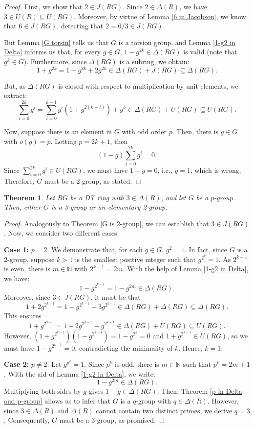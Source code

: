 \documentclass[12pt]{amsart}
\newtheorem{theorem}{Theorem}[section]
\theoremstyle{definition}
\begin{document}
\begin{proof}
First, we show that $2 \in J(RG)$. Since $2 \in \Delta(R)$, we have $3 \in U(R) \subseteq U(RG)$. Moreover, by virtue of Lemma \ref{6 in Jacobson}, we know that $6 \in J(RG)$, detecting that $2 = 6/3 \in J(RG)$.

But Lemma \ref{G torsin} tells us that $G$ is a torsion group, and Lemma \ref{1-g2 in Delta} informs us that, for every $g \in G$, $1 - g^{2k} \in \Delta(RG)$ is valid (note that $g^k \in G$). Furthermore, since $\Delta(RG)$ is a subring, we obtain:
\[
1 + g^{2k} = 1 - g^{2k} + 2g^{2k} \in \Delta(RG) + J(RG) \subseteq \Delta(RG).
\]

But, as $\Delta(RG)$ is closed with respect to multiplication by unit elements, we extract:
\[
\sum_{i=0}^{2k} g^i = \sum_{i=0}^{k-1} g^i(1 + g^{2(k-i)}) + g^k \in \Delta(RG) + U(RG) \subseteq U(RG).
\]

Now, suppose there is an element in $G$ with odd order $p$. Then, there is $g \in G$ with $o(g) = p$. Letting $p = 2k + 1$, then
\[
(1 - g)\sum_{i=0}^{2k} g^i = 0.
\]
Since $\sum_{i=0}^{2k} g^i \in U(RG)$, we must have $1 - g = 0$, i.e., $g=1$, which is wrong. Therefore, $G$ must be a 2-group, as stated.
\end{proof}

\begin{theorem}\label{G is 3-group or elementary 2-group}
Let $RG$ be a DT ring with $3 \in \Delta(R)$, and let $G$ be a $p$-group. Then, either $G$ is a 3-group or an elementary 2-group.
\end{theorem}

\begin{proof}
Analogously to Theorem \ref{G is 2-group}, we can establish that $3 \in J(RG)$. Now, we consider two different cases:

\medskip

\textbf{Case 1:} $p=2$. We demonstrate that, for each $g \in G$, $g^2=1$. In fact, since $G$ is a 2-group, suppose $k>1$ is the smallest positive integer such that $g^{2^k}=1$. As $2^{k-1}$ is even, there is $m \in \mathbb{N}$ with $2^{k-1}=2m$. With the help of Lemma \ref{1-g2 in Delta}, we have:
\[
1-g^{2^{k-1}} = 1-g^{2m} \in \Delta(RG).
\]
Moreover, since $3 \in J(RG)$, it must be that
\[
1+2g^{2^{k-1}} = 1-g^{2^{k-1}}+3g^{2^{k-1}} \in \Delta(RG) + \Delta(RG) \subseteq \Delta(RG).
\]
This ensures
\[
1+g^{2^{k-1}} = 1+2g^{2^{k-1}} -g^{2^{k-1}} \in \Delta(RG) + U(RG) \subseteq U(RG).
\]
However, $(1+g^{2^{k-1}})(1-g^{2^{k-1}}) = 1-g^{2^k} = 0$ and $1+g^{2^{k-1}} \in U(RG)$, so we must have $1-g^{2^{k-1}} = 0$, contradicting the minimality of $k$. Hence, $k=1$.

\medskip

\textbf{Case 2:} $p \neq 2$. Let $g^{p^k}=1$. Since $p^k$ is odd, there is $m \in \mathbb{N}$ such that $p^k=2m+1$. With the aid of Lemma \ref{1-g2 in Delta}, we write:
\[
1-g^{2m} \in \Delta(RG).
\]
Multiplying both sides by $g$ gives $1-g \in \Delta(RG)$. Then, Theorem \ref{p in Delta and p-group} allows us to infer that $G$ is a $q$-group with $q \in \Delta(R)$. However, since $3 \in \Delta(R)$ and $\Delta(R)$ cannot contain two distinct primes, we derive $q=3$. Consequently, $G$ must be a 3-group, as promised.
\end{proof}
\end{document}
